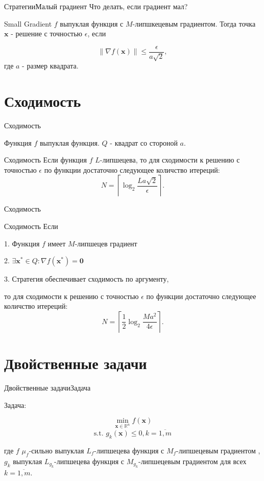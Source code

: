 \documentclass{beamer}
\begin{document}
\begin{frame}{Стратегии}{Малый градиент}
Что делать, если градиент мал?

\pause
\begin{block}{Small Gradient}
$f$ выпуклая функция с $M$-липшкецевым градиентом. Тогда точка $\textbf{x}$ - решение с точностью $\epsilon$, если

$$\|\nabla f(\textbf{x})\|\leq \frac{\epsilon}{a\sqrt{2}}, $$
где $a$ - размер квадрата.
\end{block}
\end{frame}

\section{Сходимость}

\begin{frame}{Сходимость}

Функция $f$ выпуклая функция. $Q$ - квадрат со стороной $a$.

\begin{block}{Сходимость}
Если функция $f$ $L$-липшецева, то для сходимости к решению с точностью $\epsilon$ по функции достаточно следующее количство итереций:
\begin{equation}\label{NI1}N = \left\lceil\log_2\frac{La\sqrt{2}}{\epsilon}\right\rceil.\end{equation}
\end{block}

\end{frame}

\begin{frame}{Сходимость}
\begin{block}{Сходимость}
Если

1. Функция $f$ имеет $M$-липшецев градиент

2. $\exists \textbf{x}^*\in Q: \nabla f(\textbf{x}^*) = \textbf{0}$

3. Стратегия обеспечивает сходимость по аргументу, 

то для сходимости к решению с точностью $\epsilon$ по функции достаточно следующее количство итереций:
\begin{equation}\label{NI3}N = \left\lceil\frac{1}{2}\log_2\frac{Ma^2}{4\epsilon}\right\rceil.\end{equation}
\end{block}

\end{frame}

\section{Двойственные задачи}
\begin{frame}{Двойственные задачи}{Задача}

Задача:

$$\min_{\textbf{x}\in \mathbb{R}^n} f(\textbf{x})$$
$$\text{s.t. } g_k(\textbf{x}) \leq 0, k = \overline{1,m}$$

где $f$ $\mu_f$-сильно выпуклая $L_f$-липшецева функция с $M_f$-липшецевым градиентом
, $g_k$  выпуклая $L_{g_k}$-липшецева функция с $M_{g_k}$-липшецевым градиентом для всех $k=\overline{1,m}$.
\end{frame}
\end{document}
